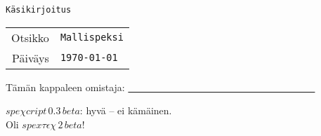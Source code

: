 \documentclass[a5paper,11pts]{article}
\begin{document}
        \begin{titlepage}
            \vspace*{\fill}
            \begin{center}
                \vspace*{1cm}
                {\Huge \tt {Käsikirjoitus}\hspace*{5cm}\phantom{.}}\\
                \vspace{.3cm}
                \begin{tabular}{r|l}
                \Large Otsikko &{\Large \tt Mallispeksi}\\
                \vspace{0.4cm}
                Päiväys &{\tt \today}\\
                \end{tabular}
                \vspace{1.5cm}
                
                \hspace*{2cm}Tämän kappaleen omistaja:  
                \underline{\ \ \ \ \ \ \ \ \ \ \ \ \ \ \ \ \ \ \ \ \ \ \ \ \ \ \ \ \ \ \ \ \ \ \ \ \ \ }\\

            \end{center}
            \vspace*{\fill}
            \flushright
                \small $spe\chi cript\,0.3\,beta$: hyvä -- ei kämäinen.\\
                \tiny Oli $spex\tau\epsilon\chi\,2\,beta$!
        \end{titlepage}
\end{document}
